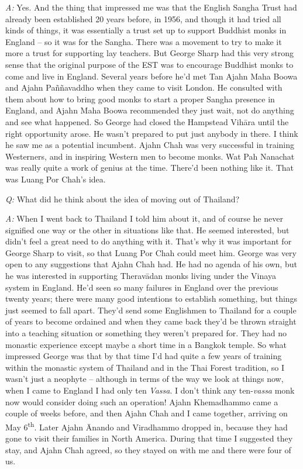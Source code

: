 \emph{A:} Yes. And the thing that impressed me was that the English
Sangha Trust had already been established 20 years before, in 1956, and
though it had tried all kinds of things, it was essentially a trust set
up to support Buddhist monks in England -- so it was for the Sangha.
There was a movement to try to make it more a trust for supporting lay
teachers. But George Sharp had this very strong sense that the original
purpose of the EST was to encourage Buddhist monks to come and live in
England. Several years before he'd met Tan Ajahn Maha Boowa and Ajahn
Paññavaddho when they came to visit London. He consulted with them about
how to bring good monks to start a proper Sangha presence in England, 
and Ajahn Maha Boowa recommended they just wait, not do anything and see
what happened. So George had closed the Hampstead Vihāra until the right
opportunity arose. He wasn't prepared to put just anybody in there. I
think he saw me as a potential incumbent. Ajahn Chah was very successful
in training Westerners, and in inspiring Western men to become monks. 
Wat Pah Nanachat was really quite a work of genius at the time. There'd
been nothing like it. That was Luang Por Chah's idea. 

\emph{Q:} What did he think about the idea of moving out of Thailand?

\emph{A:} When I went back to Thailand I told him about it, and of
course he never signified one way or the other in situations like that. 
He seemed interested, but didn't feel a great need to do anything with
it. That's why it was important for George Sharp to visit, so that Luang
Por Chah could meet him. George was very open to any suggestions that
Ajahn Chah had. He had no agenda of his own, but he was interested in
supporting Theravādan monks living under the Vinaya system in England. 
He'd seen so many failures in England over the previous twenty years; 
there were many good intentions to establish something, but things just
seemed to fall apart. They'd send some Englishmen to Thailand for a
couple of years to become ordained and when they came back they'd be
thrown straight into a teaching situation or something they weren't
prepared for. They had no monastic experience except maybe a short time
in a Bangkok temple. So what impressed George was that by that time I'd
had quite a few years of training within the monastic system of Thailand
and in the Thai Forest tradition, so I wasn't just a neophyte --
although in terms of the way we look at things now, when I came to
England I had only ten \emph{Vassa}. I don't think any ten-\emph{vassa}
monk now would consider doing such an operation! Ajahn Khemadhammo came
a couple of weeks before, and then Ajahn Chah and I came together, 
arriving on May 6\textsuperscript{th}. Later Ajahn Ānando and Viradhammo dropped in, 
because they had gone to visit their families in North America. During
that time I suggested they stay, and Ajahn Chah agreed, so they stayed
on with me and there were four of us. 

